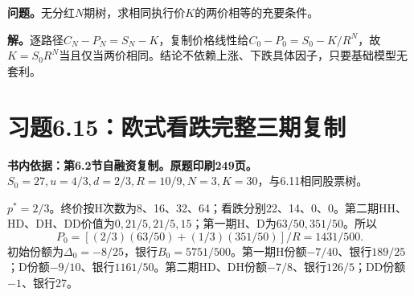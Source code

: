 \documentclass[11pt,a4paper,UTF8,fontset=fandol]{ctexart}
\begin{document}
\textbf{问题。}无分红\(N\)期树，求相同执行价\(K\)的两价相等的充要条件。

\textbf{解。}逐路径\(C_N-P_N=S_N-K\)，复制价格线性给\(C_0-P_0=S_0-K/R^N\)，故\(\boxed{K=S_0R^N}\)当且仅当两价相同。结论不依赖上涨、下跌具体因子，只要基础模型无套利。

\bigskip

\section{习题6.15：欧式看跌完整三期复制}\label{ux4e60ux98986.15ux6b27ux5f0fux770bux8dccux5b8cux6574ux4e09ux671fux590dux5236}

\textbf{书内依据：第6.2节自融资复制。原题印刷249页。}\(S_0=27,u=4/3,d=2/3,R=10/9,N=3,K=30\)，与6.11相同股票树。

\(p^*=2/3\)。终价按H次数为8、16、32、64；看跌分别22、14、0、0。第二期HH、HD、DH、DD价值为\(0,21/5,21/5,15\)；第一期H、D为\(63/50,351/50\)。所以
\[\boxed{P_0=[(2/3)(63/50)+(1/3)(351/50)]/R=1431/500.}\]
初始份额为\(\Delta_0=-8/25\)，银行\(B_0=5751/500\)。第一期H份额\(-7/40\)、银行\(189/25\)；D份额\(-9/10\)、银行\(1161/50\)。第二期HD、DH份额\(-7/8\)、银行\(126/5\)；DD份额\(-1\)、银行27。

\begingroup
\small
\setlength{\tabcolsep}{4pt}
\renewcommand{\arraystretch}{1.10}
\end{document}
